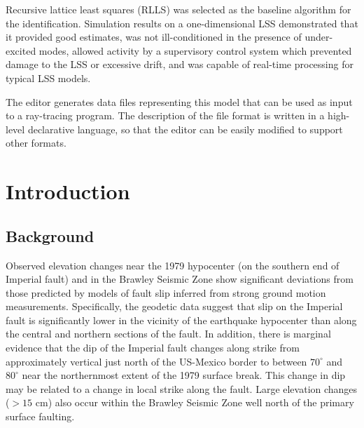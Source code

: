 \begin{abstractpage}
Recursive lattice least squares (RLLS) was selected as the baseline
algorithm for the identification.  Simulation results on a
one-dimensional LSS demonstrated that it provided good estimates, was
not ill-conditioned in the presence of under-excited modes, allowed
activity by a supervisory control system which prevented damage to the
LSS or excessive drift, and was capable of real-time processing for
typical LSS models.

The editor generates data files
representing this model that can be used as input to a ray-tracing
program.  The description of the file format is
written in a high-level declarative language, so that the editor can
be easily modified to support other formats.
\end{abstractpage}




\chapter{Introduction}

\section{Background}
Observed elevation changes near the 1979 hypocenter 
(on the southern end of Imperial fault) and in the Brawley Seismic Zone show
significant deviations from those predicted by models of fault slip
inferred from strong ground motion measurements.  Specifically, the
geodetic data suggest that 
slip on the Imperial fault is significantly lower in the
vicinity of the earthquake hypocenter
than along the central and northern sections of the
fault.  In addition, 
there is marginal evidence that the dip of the Imperial fault
changes along strike from approximately vertical
just north of the US-Mexico border to between $70^\circ$ and $80^\circ$ near
the northernmost extent of the 1979 surface break. This change in dip
may be related to a change in local strike along the fault.  Large
elevation changes ($>15$ cm) also occur within the Brawley Seismic
Zone well north of the primary surface faulting. 

